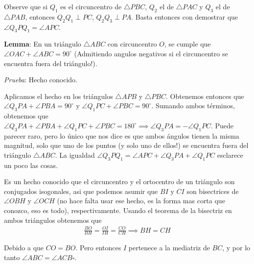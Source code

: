 \begin{sol}
	Observe que si $Q_{1}$ es el circuncentro de $\triangle PBC$, $Q_{2}$ el de $\triangle PAC$ y $Q_{3}$ el de $\triangle PAB$, entonces $Q_{2}Q_{1} \perp PC $, $Q_{2}Q_{3} \perp PA$. Basta entonces con demostrar que $\angle Q_{3}PQ_{1} = \angle APC$.
	
	\textbf{Lemma}: En un tri\'angulo $\triangle ABC$ con circuncentro $O$, se cumple que $\angle OAC + \angle ABC = 90^{\circ}$ (Admitiendo angulos negativos si el circuncentro se encuentra fuera del tri\'angulo!).
	
	\textit{Prueba}: Hecho conocido.
	
	Aplicamos el hecho en los tri\'angulos $\triangle APB $ y $\triangle PBC$. Obtenemos entonces que $\angle Q_{3}PA + \angle PBA = 90^{\circ}$ y $\angle Q_{1}PC + \angle PBC = 90^{\circ}$. Sumando ambos t\'erminos, obtenemos que $\angle Q_{3}PA + \angle PBA  + \angle Q_{1}PC + \angle PBC = 180^{\circ} \implies \angle Q_{3}PA = -\angle Q_{1}PC$. Puede parecer raro, pero lo \'unico que nos dice es que ambos \'angulos tienen la misma magnitud, solo que uno de los puntos (y solo uno de ellos!) se encuentra fuera del tri\'angulo $\triangle ABC$. La igualdad $\angle Q_{3}PQ_{1} = \angle APC + \angle Q_{3}PA + \angle Q_{1}PC$ esclarece un poco las cosas.
	
\end{sol}

\begin{sol}
	

		Es un hecho conocido que el circuncentro y el ortocentro de un tri\'angulo son conjugados isogonales, asi que podemos asumir que $BI$ y $CI$ son bisectrices de $\angle OBH$ y $\angle OCH$ (no hace falta usar ese hecho, es la forma mas corta que conozco, eso es todo), respectivamente. Usando el teorema de la bisectriz en ambos tri\'angulos obtenemos que
		\begin{align}
		\frac{BO}{BH} = \frac{OI}{IH} = \frac{CO}{CH} \implies BH = CH
		\end{align}
		
		Debido a que $CO = BO$. Pero entonces $I$ pertenece a la mediatriz de $BC$, y por lo tanto $\angle ABC = \angle ACB\square$.

\end{sol}

